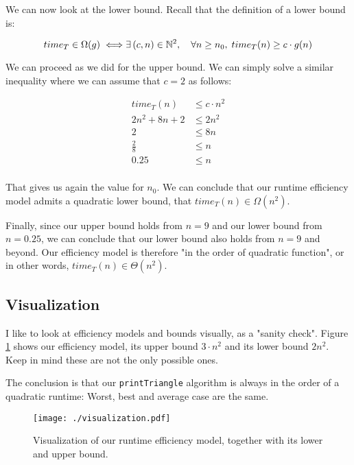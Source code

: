 \documentclass[11pt]{article}
\begin{document}
We can now look at the lower bound. Recall that the definition of a
lower bound is:

\[
   time_T \in \Omega(g) \iff \\
   \exists \, (c, n) \in \mathbb{N}^2, \quad \forall n \geq n_0, \; time_T(n) \geq c \cdot g(n)
   \]

We can proceed as we did for the upper bound. We can simply solve a
similar inequality where we can assume that \(c=2\) as follows:

\begin{align*}
time_T(n) & \leq c \cdot n^2 \\
2n^2 + 8n + 2 & \leq 2n^2 \\
2 & \leq  8n \\
\frac{2}{8} & \leq n \\
0.25 & \leq n \\
\end{align*}

That gives us again the value for \(n_0\). We can conclude that our
runtime efficiency model admits a quadratic lower bound, that
\(time_T(n) \in \Omega(n^2)\).

Finally, since our upper bound holds from \(n=9\) and our lower bound
from \(n = 0.25\), we can conclude that our lower bound also holds
from \(n=9\) and beyond. Our efficiency model is therefore "in the
order of quadratic function", or in other words, \(time_T(n) \in
   \Theta(n^2)\).

\subsection{Visualization}
\label{sec:orgb97d692}

I like to look at efficiency models and bounds visually, as a
"sanity check".  Figure \ref{fig:orgf14afb6} shows our efficiency model, its
upper bound \(3 \cdot n^2\) and its lower bound \(2n^2\). Keep in mind
these are not the only possible ones.

The conclusion is that our \texttt{printTriangle} algorithm is always in
the order of a quadratic runtime: Worst, best and average case are
the same.

\begin{figure}[htbp]
\centering
\texttt{[image: ./visualization.pdf]}
\caption{\label{fig:orgf14afb6}Visualization of our runtime efficiency model, together with its lower and upper bound.}
\end{figure}
\end{document}
